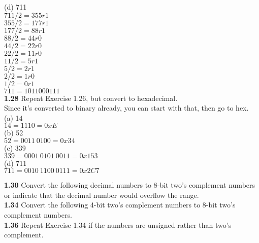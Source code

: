 \documentclass[12pt,a4paper]{report}
\begin{document}
\begin{normalsize}
(d) 711 \\
$ 711/2 = 355 r 1 $ \\
$ 355/2 = 177 r 1 $ \\
$ 177/2 = 88 r 1 $ \\
$ 88/2 = 44 r 0 $ \\
$ 44/2 = 22 r 0 $ \\
$ 22/2 = 11 r 0 $ \\
$ 11/2 = 5 r 1 $ \\
$ 5/2 = 2 r 1 $ \\
$ 2/2 = 1 r 0 $ \\
$ 1/2 = 0 r 1 $ \\
$ 711 = 1011000111 $ \\ 

\textbf{1.28} Repeat Exercise 1.26, but convert to hexadecimal. \\
Since it's converted to binary already, you can start with that, then go to hex. \\
(a) 14 \\
$ 14 = 1110 = 0xE $ \\

(b) 52 \\
$ 52 = 0011\: 0100 = 0x34$ \\

(c) 339 \\
$ 339 = 0001\: 0101\: 0011 = 0x153 $\\

(d) 711 \\
$ 711 = 0010\: 1100\: 0111 = 0x2C7 $

\textbf{1.30} Convert the following decimal numbers to 8-bit two's complement numbers or indicate that the decimal number would overflow the range. \\


\textbf{1.34} Convert the following 4-bit two's complement numbers to 8-bit two's complement numbers. \\

\textbf{1.36} Repeat Exercise 1.34 if the numbers are unsigned rather than two's complement. \\








\end{normalsize}
\end{document}
